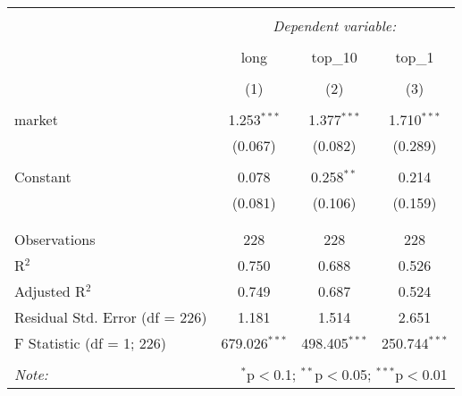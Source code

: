 
\begin{table}[!htbp] \centering 
  \caption{} 
  \label{} 
\begin{tabular}{@{\extracolsep{5pt}}lccc} 
\\[-1.8ex]\hline 
\hline \\[-1.8ex] 
 & \multicolumn{3}{c}{\textit{Dependent variable:}} \\ 
\cline{2-4} 
\\[-1.8ex] & long & top\_10 & top\_1 \\ 
\\[-1.8ex] & (1) & (2) & (3)\\ 
\hline \\[-1.8ex] 
 market & 1.253$^{***}$ & 1.377$^{***}$ & 1.710$^{***}$ \\ 
  & (0.067) & (0.082) & (0.289) \\ 
  & & & \\ 
 Constant & 0.078 & 0.258$^{**}$ & 0.214 \\ 
  & (0.081) & (0.106) & (0.159) \\ 
  & & & \\ 
\hline \\[-1.8ex] 
Observations & 228 & 228 & 228 \\ 
R$^{2}$ & 0.750 & 0.688 & 0.526 \\ 
Adjusted R$^{2}$ & 0.749 & 0.687 & 0.524 \\ 
Residual Std. Error (df = 226) & 1.181 & 1.514 & 2.651 \\ 
F Statistic (df = 1; 226) & 679.026$^{***}$ & 498.405$^{***}$ & 250.744$^{***}$ \\ 
\hline 
\hline \\[-1.8ex] 
\textit{Note:}  & \multicolumn{3}{r}{$^{*}$p$<$0.1; $^{**}$p$<$0.05; $^{***}$p$<$0.01} \\ 
\end{tabular} 
\end{table} 
